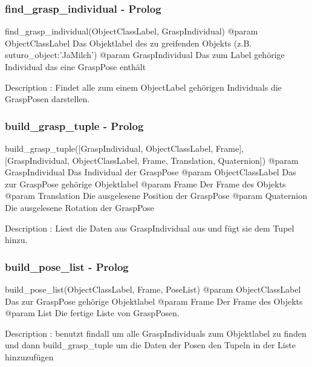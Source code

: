 \documentclass{suturo}
\begin{document}
\subsubsection{find\_grasp\_individual - Prolog}
\begin{spverbatim}
find_grasp_individual(ObjectClassLabel, GraspIndividual)
@param ObjectClassLabel Das Objektlabel des zu greifenden Objekts 
       (z.B. suturo_object:'JaMilch')
@param GraspIndividual Das zum Label gehörige Individual das 
       eine GraspPose enthält

Description : Findet alle zum einem ObjectLabel gehörigen Individuals die 
GraspPosen darstellen.
\end{spverbatim}

\subsubsection{build\_grasp\_tuple - Prolog}
\begin{spverbatim}
build_grasp_tuple([GraspIndividual, ObjectClassLabel, Frame], 
                  [GraspIndividual, ObjectClassLabel, Frame, 
                  Translation, Quaternion])
@param GraspIndividual Das Individual der GraspPose
@param ObjectClassLabel Das zur GraspPose gehörige Objektlabel
@param Frame Der Frame des Objekts
@param Translation Die ausgelesene Position der GraspPose
@param Quaternion Die ausgelesene Rotation der GraspPose

Description : Liest die Daten aus GraspIndividual aus und fügt sie dem 
Tupel hinzu.
\end{spverbatim}

\subsubsection{build\_pose\_list - Prolog}
\begin{spverbatim}
build_pose_list(ObjectClassLabel, Frame, PoseList)
@param ObjectClassLabel Das zur GraspPose gehörige Objektlabel
@param Frame Der Frame des Objekts
@param List Die fertige Liste von GraspPosen.

Description : benutzt findall um alle GraspIndividuals zum Objektlabel zu 
finden und dann build_grasp_tuple um die Daten der Posen den 
Tupeln in der Liste hinzuzufügen
\end{spverbatim}
\end{document}
